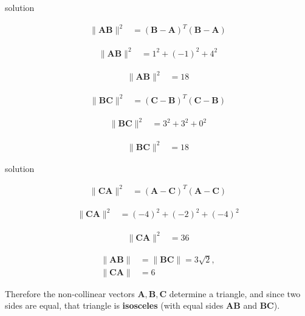 \documentclass{beamer}
\numberwithin{equation}{section}
\theoremstyle{remark}
\let\vec\mathbf
\begin{document}
\begin{frame}{solution}

\begin{align}
\|\vec{AB}\|^2 &= (\vec{B}-\vec{A})^T(\vec{B}-\vec{A})
\end{align}

\begin{align}
\|\vec{AB}\|^2 &= 1^2 + (-1)^2 + 4^2
\end{align}

\begin{align}
\|\vec{AB}\|^2 &= 18
\end{align}

\begin{align}
\|\vec{BC}\|^2 &= (\vec{C}-\vec{B})^T(\vec{C}-\vec{B})
\end{align}

\begin{align}
\|\vec{BC}\|^2 &= 3^2 + 3^2 + 0^2
\end{align}

\begin{align}
\|\vec{BC}\|^2 &= 18
\end{align}

\end{frame}
\begin{frame}{solution}

\begin{align}
\|\vec{CA}\|^2 &= (\vec{A}-\vec{C})^T(\vec{A}-\vec{C})
\end{align}

\begin{align}
\|\vec{CA}\|^2 &= (-4)^2 + (-2)^2 + (-4)^2
\end{align}

\begin{align}
\|\vec{CA}\|^2 &= 36
\end{align}



\begin{align}
\|\vec{AB}\| &= \|\vec{BC}\| = 3\sqrt{2}, \\
\|\vec{CA}\| &= 6
\end{align}

Therefore the non-collinear vectors $\vec{A},\vec{B},\vec{C}$ determine a triangle, and since two sides are equal, that triangle is \textbf{isosceles} (with equal sides $\vec{AB}$ and $\vec{BC}$).

\end{frame}
\end{document}
